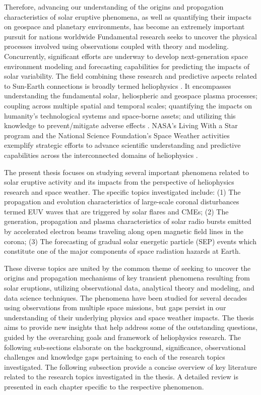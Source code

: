 Therefore, advancing our understanding of the origins and propagation characteristics of solar eruptive phenomena, as well as quantifying their impacts on geospace and planetary environments, has become an extremely important pursuit for nations worldwide Fundamental research seeks to uncover the physical processes involved using observations coupled with theory and modeling. Concurrently, significant efforts are underway to develop next-generation space environment modeling and forecasting capabilities for predicting the impacts of solar variability. The field combining these research and predictive aspects related to Sun-Earth connections is broadly termed heliophysics \citep{schrijver_siscoe_2010}. It encompasses understanding the fundamental solar, heliospheric and geospace plasma processes; coupling across multiple spatial and temporal scales; quantifying the impacts on humanity's technological systems and space-borne assets; and utilizing this knowledge to prevent/mitigate adverse effects \citep{schrijver_2015a, schrijver_2015b}. NASA's Living With a Star program and the National Science Foundation's Space Weather activities exemplify strategic efforts to advance scientific understanding and predictive capabilities across the interconnected domains of heliophysics \citep{brewer_2002}.

The present thesis focuses on studying several important phenomena related to solar eruptive activity and its impacts from the perspective of heliophysics research and space weather. The specific topics investigated include: (1) The propagation and evolution characteristics of large-scale coronal disturbances termed EUV waves that are triggered by solar flares and CMEs; (2) The generation, propagation and plasma characteristics of solar radio bursts emitted by accelerated electron beams traveling along open magnetic field lines in the corona; (3) The forecasting of gradual solar energetic particle (SEP) events which constitute one of the major components of space radiation hazards at Earth.

These diverse topics are united by the common theme of seeking to uncover the origins and propagation mechanisms of key transient phenomena resulting from solar eruptions, utilizing observational data, analytical theory and modeling, and data science techniques. The phenomena have been studied for several decades using observations from multiple space missions, but gaps persist in our understanding of their underlying physics and space weather impacts. The thesis aims to provide new insights that help address some of the outstanding questions, guided by the overarching goals and framework of heliophysics research. The following sub-sections elaborate on the background, significance, observational challenges and knowledge gaps pertaining to each of the research topics investigated. The following subsection provide a concise overview of key literature related to the research topics investigated in the thesis. A detailed review is presented in each chapter specific to the respective phenomenon.

